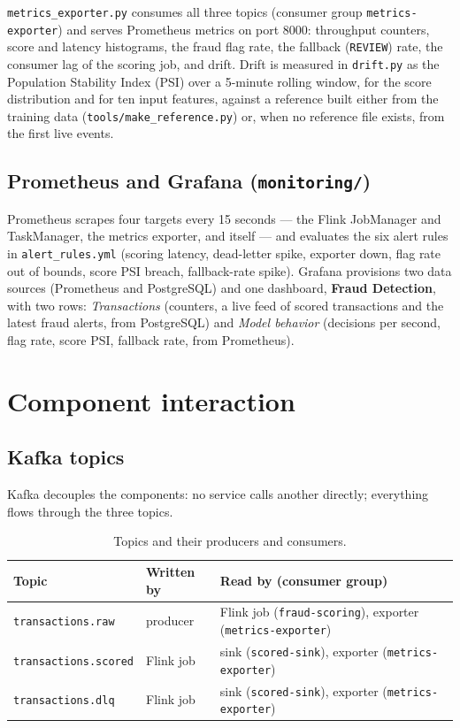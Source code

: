 \documentclass[11pt,a4paper]{article}
\newcommand{\code}[1]{\texttt{#1}}
\begin{document}
\code{metrics\_exporter.py} consumes all three topics (consumer group
\code{metrics-exporter}) and serves Prometheus metrics on port 8000:
throughput counters, score and latency histograms, the fraud flag rate, the
fallback (\code{REVIEW}) rate, the consumer lag of the scoring job, and drift.
Drift is measured in \code{drift.py} as the Population Stability Index (PSI)
over a 5-minute rolling window, for the score distribution and for ten input
features, against a reference built either from the training data
(\code{tools/make\_reference.py}) or, when no reference file exists, from the
first live events.

\subsection{Prometheus and Grafana (\code{monitoring/})}

Prometheus scrapes four targets every 15 seconds --- the Flink JobManager and
TaskManager, the metrics exporter, and itself --- and evaluates the six alert
rules in \code{alert\_rules.yml} (scoring latency, dead-letter spike, exporter
down, flag rate out of bounds, score PSI breach, fallback-rate spike). Grafana
provisions two data sources (Prometheus and PostgreSQL) and one dashboard,
\textbf{Fraud Detection}, with two rows: \emph{Transactions} (counters, a live
feed of scored transactions and the latest fraud alerts, from PostgreSQL) and
\emph{Model behavior} (decisions per second, flag rate, score PSI, fallback
rate, from Prometheus).

\section{Component interaction}

\subsection{Kafka topics}

Kafka decouples the components: no service calls another directly; everything
flows through the three topics.

\begin{table}[h]
\centering
\small
\begin{tabular}{@{}lll@{}}
\toprule
Topic & Written by & Read by (consumer group) \\
\midrule
\code{transactions.raw}    & producer  & Flink job (\code{fraud-scoring}), exporter (\code{metrics-exporter}) \\
\code{transactions.scored} & Flink job & sink (\code{scored-sink}), exporter (\code{metrics-exporter}) \\
\code{transactions.dlq}    & Flink job & sink (\code{scored-sink}), exporter (\code{metrics-exporter}) \\
\bottomrule
\end{tabular}
\caption{Topics and their producers and consumers.}
\end{table}
\end{document}
